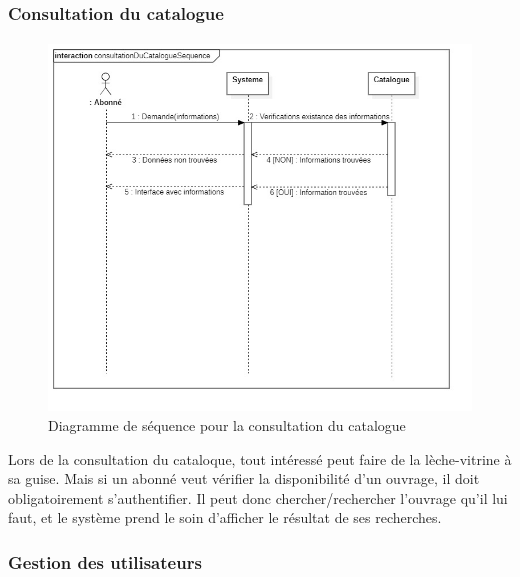 \subsubsection{Consultation du catalogue} 
\paragraph{}
\begin{figure}[h]
        \centering
        \includegraphics[width=1\textwidth]{consultationDuCatalogueSequence}
        \caption{Diagramme de séquence pour la consultation du catalogue}
        \label{image-consultationDuCatalogueSequence}
        \end{figure}
\par 
Lors de la consultation du cataloque, tout intéressé peut faire de la lèche-vitrine à 
sa guise. Mais si un abonné veut vérifier la disponibilité d'un ouvrage, il doit 
obligatoirement s'authentifier. Il peut donc chercher/rechercher l'ouvrage qu'il lui faut, 
et le système prend le soin d'afficher le résultat de ses recherches.
\subsubsection{Gestion des utilisateurs} 
